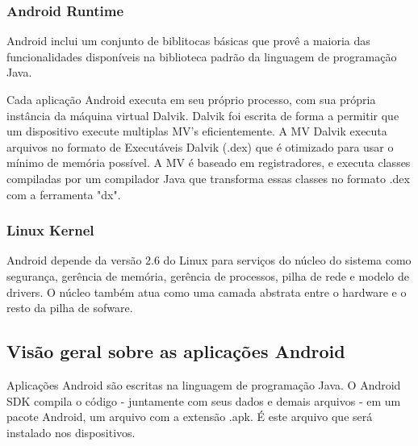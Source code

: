 \subsubsection{Android Runtime}

Android inclui um conjunto de biblitocas básicas que provê a maioria das funcionalidades
disponíveis na biblioteca padrão da linguagem de programação Java.

Cada aplicação Android executa em seu próprio processo, com sua própria instância 
da máquina virtual Dalvik. Dalvik foi escrita de forma a permitir que um dispositivo
execute multiplas MV's eficientemente. A MV Dalvik executa arquivos no formato de 
Executáveis Dalvik (.dex) que é otimizado para usar o mínimo de memória possível. 
A MV é baseado em registradores, e executa classes compiladas por um compilador Java 
que transforma essas classes no formato .dex com a ferramenta "dx".

\subsubsection{Linux Kernel}

Android depende da versão 2.6 do Linux para serviços do núcleo do sistema como 
segurança, gerência de memória, gerência de processos, pilha de rede e modelo de 
drivers. O núcleo também atua como uma camada abstrata entre o hardware e o resto
da pilha de sofware.

\subsection{Visão geral sobre as aplicações Android}

Aplicações Android são escritas na linguagem de programação Java. O Android SDK
 compila o código - juntamente com seus dados e demais arquivos - em um pacote 
 Android, um arquivo com a extensão .apk. É este arquivo que será instalado nos 
 dispositivos.

